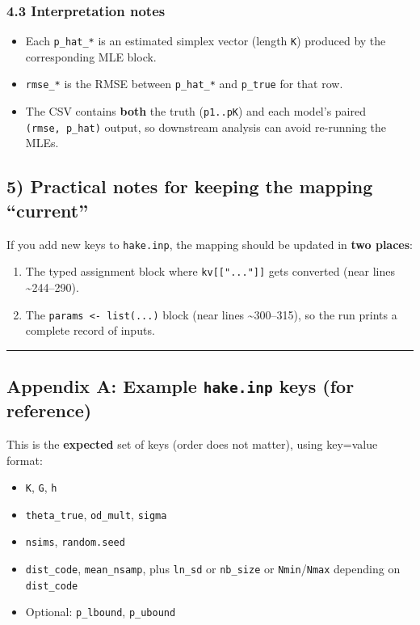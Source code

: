 \documentclass[
]{article}
\providecommand{\tightlist}{%
  \setlength{\itemsep}{0pt}\setlength{\parskip}{0pt}}
\begin{document}
\subsubsection{4.3 Interpretation notes}\label{interpretation-notes}

\begin{itemize}
\tightlist
\item
  Each \texttt{p\_hat\_*} is an estimated simplex vector (length
  \texttt{K}) produced by the corresponding MLE block.
\item
  \texttt{rmse\_*} is the RMSE between \texttt{p\_hat\_*} and
  \texttt{p\_true} for that row.
\item
  The CSV contains \textbf{both} the truth (\texttt{p1..pK}) and each
  model's paired \texttt{(rmse,\ p\_hat)} output, so downstream analysis
  can avoid re-running the MLEs.
\end{itemize}

\subsection{5) Practical notes for keeping the mapping
``current''}\label{practical-notes-for-keeping-the-mapping-current}

If you add new keys to \texttt{hake.inp}, the mapping should be updated
in \textbf{two places}:

\begin{enumerate}
\def\labelenumi{\arabic{enumi}.}
\tightlist
\item
  The typed assignment block where \texttt{kv{[}{[}"..."{]}{]}} gets
  converted (near lines \textasciitilde244--290).
\item
  The \texttt{params\ \textless{}-\ list(...)} block (near lines
  \textasciitilde300--315), so the run prints a complete record of
  inputs.
\end{enumerate}

\begin{center}\rule{0.5\linewidth}{0.5pt}\end{center}

\subsection{\texorpdfstring{Appendix A: Example \texttt{hake.inp} keys
(for
reference)}{Appendix A: Example hake.inp keys (for reference)}}\label{appendix-a-example-hake.inp-keys-for-reference}

This is the \textbf{expected} set of keys (order does not matter), using
key=value format:

\begin{itemize}
\tightlist
\item
  \texttt{K}, \texttt{G}, \texttt{h}
\item
  \texttt{theta\_true}, \texttt{od\_mult}, \texttt{sigma}
\item
  \texttt{nsims}, \texttt{random.seed}
\item
  \texttt{dist\_code}, \texttt{mean\_nsamp}, plus \texttt{ln\_sd} or
  \texttt{nb\_size} or \texttt{Nmin}/\texttt{Nmax} depending on
  \texttt{dist\_code}
\item
  Optional: \texttt{p\_lbound}, \texttt{p\_ubound}
\end{itemize}
\end{document}
